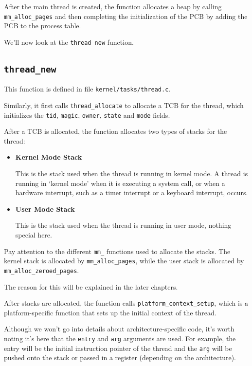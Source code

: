 After the main thread is created, the function allocates a heap by calling \texttt{mm\_alloc\_pages}
and then completing the initialization of the PCB by adding the PCB to the process table.

We'll now look at the \texttt{thread\_new} function.

\subsection{\texttt{thread\_new}}

This function is defined in file \texttt{kernel/tasks/thread.c}.

Similarly, it first calls \texttt{thread\_allocate} to allocate a TCB for the thread, which
initializes the \texttt{tid}, \texttt{magic}, \texttt{owner}, \texttt{state} and \texttt{mode}
fields.

After a TCB is allocated, the function allocates two types of stacks for the thread:

\begin{itemize}
    \item \textbf{Kernel Mode Stack}

          This is the stack used when the thread is running in kernel mode. A thread is running
          in `kernel mode' when it is executing a system call, or when a hardware interrupt, such as
          a timer interrupt or a keyboard interrupt, occurs.

    \item \textbf{User Mode Stack}

          This is the stack used when the thread is running in user mode, nothing special here.
\end{itemize}

\begin{tip}
    \item Pay attention to the different \texttt{mm\_} functions used to allocate the stacks.
    The kernel stack is allocated by \texttt{mm\_alloc\_pages}, while the user stack is
    allocated by \texttt{mm\_alloc\_zeroed\_pages}.
    \item The reason for this will be explained in the later chapters.
\end{tip}

After stacks are allocated, the function calls \texttt{platform\_context\_setup}, which is
a platform-specific function that sets up the initial context of the thread.

Although we won't go into details about architecture-specific code, it's worth noting it's here
that the \texttt{entry} and \texttt{arg} arguments are used. For example, the entry will be
the initial instruction pointer of the thread and the \texttt{arg} will be pushed onto the stack
or passed in a register (depending on the architecture).

